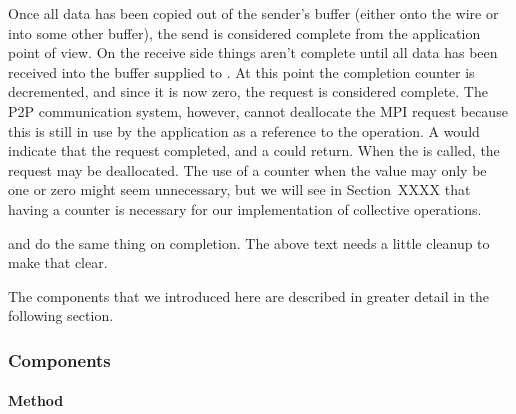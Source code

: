 Once all data has been copied out of the sender's buffer (either onto the wire
or into some other buffer), the send is considered complete from the
application point of view.  On the receive side things aren't complete until
all data has been received into the buffer supplied to .
%
At this point the completion counter is decremented, and since it is now zero,
the request is considered complete.  The P2P communication system, however,
cannot deallocate the MPI request because this is still in use by the
application as a reference to the operation.
%
A  would indicate that
the request completed, and a  could return.
%
When the  is called, the request may be deallocated.
%
The use of a counter when the value may only be one or zero might seem
unnecessary, but we will see in Section~XXXX that having a counter is
necessary for our implementation of collective operations.

\begin{cmt}
   and  do the same thing on completion.  The
  above text needs a little cleanup to make that clear.
\end{cmt}

The components that we introduced here are described in greater detail in the
following section.

\subsubsection{Components}

%


\paragraph{Method}

